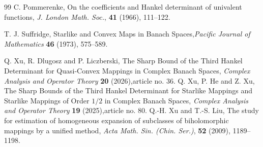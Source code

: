 \documentclass[11pt, reqno]{amsart}
\numberwithin{equation}{section}
\begin{document}
\begin{thebibliography}{99}
 {\sc C. Pommerenke}, On the coefficients and Hankel determinant of univalent functions, \textit{J. London Math. Soc.},
\textbf{41} (1966), 111--122.

 {\sc T. J. Suffridge}, Starlike and Convex Maps in Banach Spaces,\textit{Pacific Journal of Mathematics} \textbf{46} (1973), 575--589.

 {\sc Q. Xu, R. Dlugosz and P. Liczberski}, The Sharp Bound of the Third Hankel Determinant for Quasi-Convex Mappings in Complex Banach Spaces, \textit{Complex Analysis and Operator Theory} \textbf{20} (2026),article no. 36.
 {\sc Q. Xu, P. He and Z. Xu}, The Sharp Bounds of the Third Hankel Determinant for Starlike Mappings and Starlike Mappings of Order $1/2$ in Complex Banach Spaces, \textit{Complex Analysis and Operator Theory} \textbf{19} (2025),article no. 80.
 {\sc Q.-H. Xu and T.-S. Liu}, The study for estimation of homogeneous expansion of subclasses of biholomorphic mappings by a unified method, \textit{Acta Math. Sin. (Chin. Ser.)}, \textbf{52} (2009), 1189--1198.

\end{thebibliography}
\end{document}
